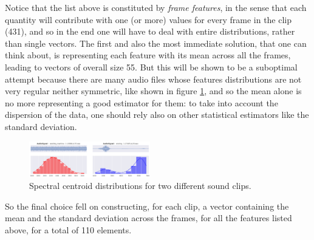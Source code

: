 Notice that the list above is constituted by \textit{frame features}, in the sense that each quantity will contribute with one (or more) values for every frame in the clip (431), and so in the end one will have to deal with entire distributions, rather than single vectors. The first and also the most immediate solution, that one can think about, is representing each feature with its mean across all the frames, leading to vectors of overall size 55. But this will be shown to be a suboptimal attempt because there are many audio files whose features distributions are not very regular neither symmetric, like shown in figure \ref{fig:ex_distrib}, and so the mean alone is no more representing a good estimator for them: to take into account the dispersion of the data, one should rely also on other statistical estimators like the standard deviation.
\begin{figure}[!h]
	\centering
	\includegraphics[width=0.47\textwidth]{pictures/ex_distrib.pdf}
	\caption{Spectral centroid distributions for two different sound clips.}
	\label{fig:ex_distrib}
\end{figure}
So the final choice fell on constructing, for each clip, a vector containing the mean and the standard deviation across the frames, for all the features listed above, for a total of 110 elements.

